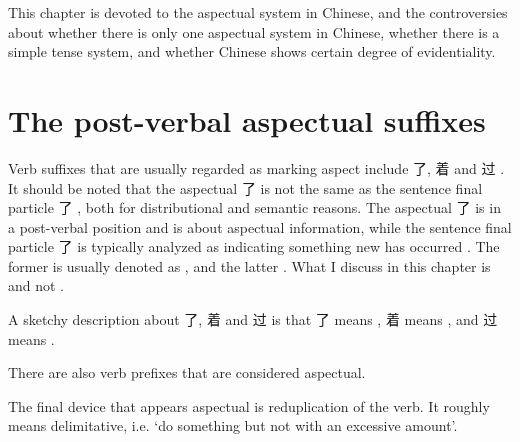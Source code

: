This chapter is devoted to the aspectual system in Chinese, 
and the controversies about whether there is only one aspectual system in Chinese, 
whether there is a simple tense system, and whether Chinese shows certain degree of evidentiality.

\section{The post-verbal aspectual suffixes}\label{sec:post-verbal-aspect}

Verb suffixes that are usually regarded as marking aspect include 了, 着 and 过 . 
It should be noted that the aspectual 了 is not the same as the sentence final particle 了 , 
both for distributional and semantic reasons.
The aspectual 了 is in a post-verbal position and is about aspectual information, 
while the sentence final particle 了 is typically analyzed as indicating something new has occurred 
\citep[]{zhudexigrammar}.
The former is usually denoted as , and the latter  \citep{peng2005le12}. 
What I discuss in this chapter is  and not . 

A sketchy description about 了, 着 and 过 is that 
了 means , 着 means , and 过 means  
\cite[]{li1989mandarin}.

There are also verb prefixes that are considered aspectual.

The final device that appears aspectual is reduplication of the verb. 
It roughly means delimitative, i.e. `do something but not with an excessive amount'.
